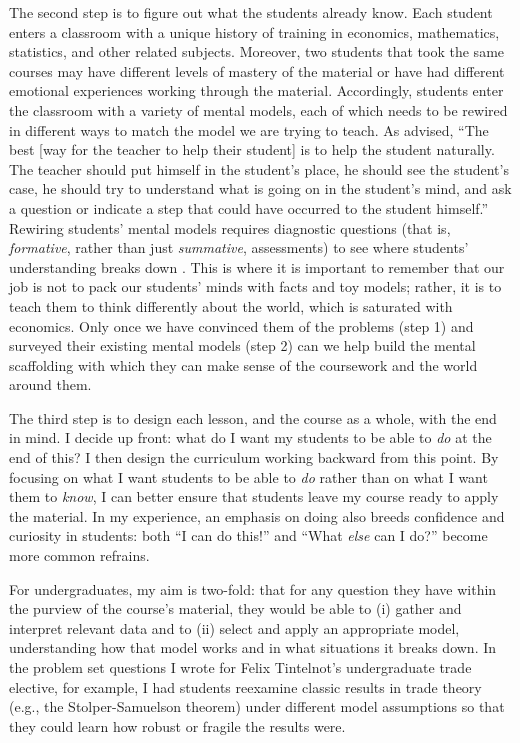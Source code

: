 \documentclass{jmstatement}
\begin{document}
The second step is to figure out what the students already know.
Each student enters a classroom with a unique history of training in economics,
mathematics, statistics, and other related subjects.
Moreover, two students that took the same courses may have different levels of
mastery of the material or have had different emotional experiences working
through the material.
Accordingly, students enter the classroom with a variety of mental models, each of
which needs to be rewired in different ways to match the model we are trying to teach.
As \citet{Polya2014} advised, ``The best [way for the teacher to help their student]
is to help the student naturally. The teacher should put himself in the student's
place, he should see the student's case, he should try to understand what is
going on in the student's mind, and ask a question or indicate a step that could
have occurred to the student himself.''
Rewiring students' mental models requires diagnostic questions (that is,
\textit{formative}, rather than just \textit{summative}, assessments) to see
where students' understanding breaks down \citep{Wilson2019}.
This is where it is important to remember that our job is not to pack our students'
minds with facts and toy models; rather, it is to teach them to think differently
about the world, which is saturated with economics.
Only once we have convinced them of the problems (step 1) and surveyed their
existing mental models (step 2) can we help build the mental scaffolding with
which they can make sense of the coursework and the world around them.

The third step is to design each lesson, and the course as a whole,
with the end in mind. I decide up front: what do I want my students to be able
to \textit{do} at the end of this?
I then design the curriculum working backward from this point.
By focusing on what I want students to be able to \textit{do} rather than on
what I want them to \textit{know},
I can better ensure that students leave my course ready to apply the material.
In my experience, an emphasis on doing also breeds confidence and curiosity in
students: both ``I can do this!'' and ``What \textit{else} can I do?''
become more common refrains.

For undergraduates, my aim is two-fold:
that for any question they have within the purview of the course's material,
they would be able to
(i) gather and interpret relevant data and to
(ii) select and apply an appropriate model, understanding how that model works
and in what situations it breaks down.
In the problem set questions I wrote for Felix Tintelnot's undergraduate trade elective,
for example,
I had students reexamine classic results in trade theory
(e.g., the Stolper-Samuelson theorem)
under different model assumptions so that they could learn how robust or fragile
the results were.
\end{document}
